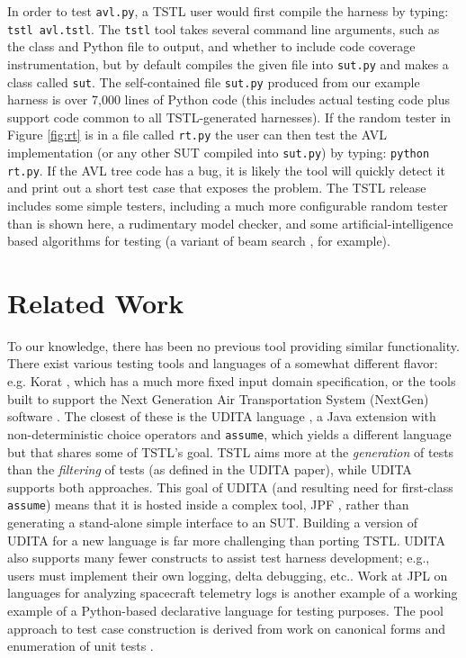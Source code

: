 \documentclass{sig-alternate}
\begin{document}
In order to test {\tt avl.py}, a TSTL user would first compile the
harness by typing: {\tt tstl avl.tstl}.  The {\tt tstl} tool takes
several command line arguments, such as the class and Python file to
output, and whether to include code coverage instrumentation, but by
default compiles the given file into {\tt sut.py} and makes a class
called {\tt sut}.  The self-contained file {\tt sut.py} produced from
our example harness is over 7,000 lines of Python code (this includes
actual testing code plus support code common to all TSTL-generated
harnesses).  If the random tester in Figure \ref{fig:rt} is in a file
called {\tt rt.py} the user can then test the AVL implementation (or
any other SUT compiled into {\tt sut.py}) by typing: {\tt python
  rt.py}.  If the AVL tree code has a bug, it is likely the tool will
quickly detect it and print out a short test case that exposes the
problem.  The TSTL release includes some simple testers, including a
much more configurable random tester than is shown here, a rudimentary
model checker, and some artificial-intelligence based algorithms for
testing (a variant of beam search \cite{NFM15}, for example).

\section{Related Work}


To our knowledge, there has been no previous tool providing similar
functionality.  
There exist various testing tools and languages of a somewhat
different flavor: e.g. Korat \cite{Korat}, which has a much more fixed
input domain specification, or the tools built to support the Next
Generation Air Transportation System (NextGen) software
\cite{TameInputs}.  The closest of these is the UDITA language
\cite{UDITA}, a Java extension with non-deterministic choice
operators and {\tt assume}, which yields a different language but
that shares some of TSTL's goal.  TSTL aims more at the \emph{generation} of
tests than the \emph{filtering} of tests (as defined in the UDITA
paper), while UDITA supports both approaches.  This goal of UDITA (and
resulting need for first-class {\tt assume}) means that it is hosted
inside a complex tool, JPF
\cite{JPF2}, rather than generating a stand-alone simple interface to
an SUT.  Building a version of UDITA for a new language is
far more challenging than porting TSTL.  UDITA also supports many fewer
constructs to assist test harness development; e.g., users must
implement their own logging, delta debugging, etc..
Work at JPL on languages for analyzing spacecraft telemetry
logs \cite{scriptstospecs} is another example of a working example of a
Python-based declarative language for testing purposes.  The pool
approach to test case construction is derived from work on canonical
forms and enumeration of unit tests \cite{AndrewsTR}.
\end{document}
